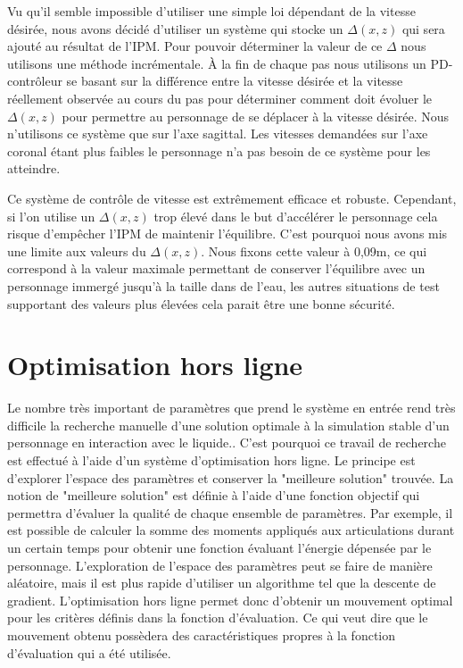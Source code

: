 \documentclass[runningheads,a4paper]{llncs}
\begin{document}
Vu qu'il semble impossible d'utiliser une simple loi dépendant de la vitesse désirée, nous avons décidé d'utiliser un système qui stocke un $\Delta(x,z)$ qui sera ajouté au résultat de l'IPM. Pour pouvoir déterminer la valeur de ce $\Delta$ nous utilisons une méthode incrémentale. \`A la fin de chaque pas nous utilisons un PD-contrôleur se basant sur la différence entre la vitesse désirée et la vitesse réellement observée au cours du pas pour déterminer comment doit évoluer le $\Delta(x,z)$ pour permettre au personnage de se déplacer à la vitesse désirée. Nous n'utilisons ce système que sur l'axe sagittal. Les vitesses demandées sur l'axe coronal étant plus faibles le personnage n'a pas besoin de ce système pour les atteindre.

Ce système de contrôle de vitesse est extrêmement efficace et robuste. Cependant, si l'on utilise un $\Delta(x,z)$ trop élevé dans le but d'accélérer le personnage cela risque d'empêcher l'IPM de maintenir l'équilibre. C'est pourquoi nous avons mis une limite aux valeurs du $\Delta(x,z)$. Nous fixons cette valeur à 0,09m, ce qui correspond à la valeur maximale permettant de conserver l'équilibre avec un personnage immergé jusqu'à la taille dans de l'eau, les autres situations de test supportant des valeurs plus élevées cela parait être une bonne sécurité. 
%

\section{Optimisation hors ligne}
\label{sec:optimisation}
%
Le nombre très important de paramètres que prend le système en entrée rend très difficile la recherche manuelle d'une solution optimale à la simulation stable d'un personnage en interaction avec le liquide.. C'est pourquoi ce travail de recherche est effectué à l'aide d'un système d'optimisation hors ligne. Le principe est d'explorer l'espace des paramètres et conserver la "meilleure solution" trouvée. La notion de "meilleure solution"  est définie à l'aide d'une fonction objectif qui permettra d'évaluer la qualité de chaque ensemble de paramètres. Par exemple, il est possible de calculer la somme des moments appliqués aux articulations durant un certain temps pour obtenir une fonction évaluant l'énergie dépensée par le personnage. L'exploration de l'espace des paramètres peut se faire de manière aléatoire, mais il est plus rapide d'utiliser un algorithme tel que la descente de gradient. L'optimisation hors ligne permet donc d'obtenir un mouvement optimal pour les critères définis dans la fonction d'évaluation. Ce qui veut dire que le mouvement obtenu possèdera des caractéristiques propres à la fonction d'évaluation qui a été utilisée.
\end{document}
